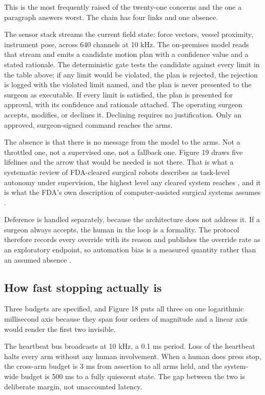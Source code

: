 This is the most frequently raised of the twenty-one concerns and the one a
paragraph answers worst. The chain has four links and one absence.

The sensor stack streams the current field state: force vectors, vessel
proximity, instrument pose, across 640 channels at 10 kHz. The on-premises model
reads that stream and emits a candidate motion plan with a confidence value and
a stated rationale. The deterministic gate tests the candidate against every
limit in the table above; if any limit would be violated, the plan is rejected,
the rejection is logged with the violated limit named, and the plan is never
presented to the surgeon as executable. If every limit is satisfied, the plan is
presented for approval, with its confidence and rationale attached. The
operating surgeon accepts, modifies, or declines it. Declining requires no
justification. Only an approved, surgeon-signed command reaches the arms.

The absence is that there is no message from the model to the arms. Not a
throttled one, not a supervised one, not a fallback one. Figure 19 draws five
lifelines and the arrow that would be needed is not there. That is what a
systematic review of FDA-cleared surgical robots describes as task-level
autonomy under supervision, the highest level any cleared system reaches
\cite{LeeAuto2024X}, and it is what the FDA's own description of
computer-assisted surgical systems assumes \cite{FDARobot2022}.

Deference is handled separately, because the architecture does not address it.
If a surgeon always accepts, the human in the loop is a formality. The protocol
therefore records every override with its reason and publishes the override rate
as an exploratory endpoint, so automation bias is a measured quantity rather
than an assumed absence \cite{FDATrans2024}.

\subsection{How fast stopping actually is}

Three budgets are specified, and Figure 18 puts all three on one logarithmic
millisecond axis because they span four orders of magnitude and a linear axis
would render the first two invisible.

The heartbeat bus broadcasts at 10 kHz, a 0.1 ms period. Loss of the heartbeat
halts every arm without any human involvement. When a human does press stop, the
cross-arm budget is 3 ms from assertion to all arms held, and the system-wide
budget is 500 ms to a fully quiescent state. The gap between the two is
deliberate margin, not unaccounted latency.

